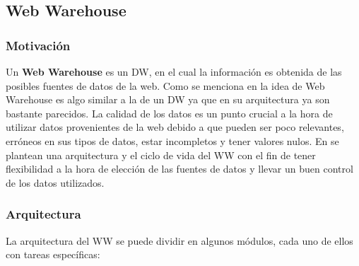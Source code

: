 \documentclass[a4paper,11pt]{article}
\begin{document}
    
    \subsection{Web Warehouse}
    
    \subsubsection{Motivación}
    
    Un \textbf{Web Warehouse} es un DW, en el cual la información es obtenida de las posibles fuentes de datos de la web. Como se menciona en \cite{webwarehouse}
    la idea de Web Warehouse es algo similar a la de un DW ya que en su arquitectura ya son bastante parecidos. La calidad de los datos es un punto crucial a la
    hora de utilizar datos provenientes de la web debido a que pueden ser poco relevantes, erróneos en sus tipos de datos, estar incompletos y tener valores
    nulos. En \cite{webwarehouse} se plantean una arquitectura y el ciclo de vida del WW con el fin de tener flexibilidad a la hora de elección de las fuentes de
    datos y llevar un buen control de los datos utilizados.
    
    
    \subsubsection{Arquitectura}
    
    La arquitectura del WW se puede dividir en algunos módulos, cada uno de ellos con tareas específicas:
    
\end{document}
